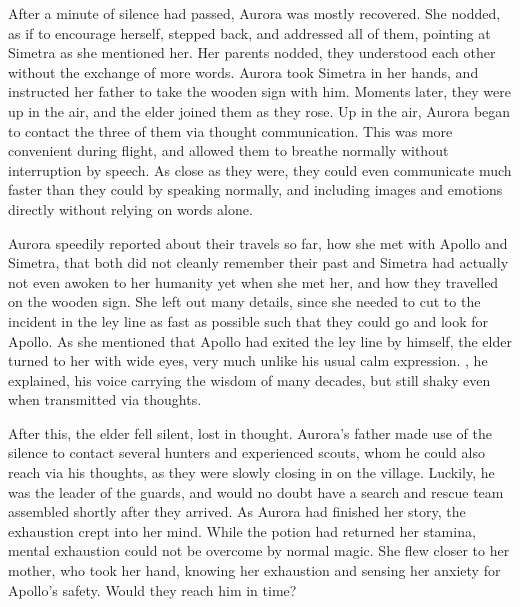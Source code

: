 After a minute of silence had passed, Aurora was mostly recovered. She nodded, as if to encourage herself, stepped back, and addressed all of them, pointing at Simetra as she mentioned her. 
Her parents nodded, they understood each other without the exchange of more words. Aurora took Simetra in her hands, and instructed her father to take the wooden sign with him. Moments later, they were up in the air, and the elder joined them as they rose. Up in the air, Aurora began to contact the three of them via thought communication. This was more convenient during flight, and allowed them to breathe normally without interruption by speech. As close as they were, they could even communicate much faster than they could by speaking normally, and including images and emotions directly without relying on words alone.

Aurora speedily reported about their travels so far, how she met with Apollo and Simetra, that both did not cleanly remember their past and Simetra had actually not even awoken to her humanity yet when she met her, and how they travelled on the wooden sign. She left out many details, since she needed to cut to the incident in the ley line as fast as possible such that they could go and look for Apollo. As she mentioned that Apollo had exited the ley line by himself, the elder turned to her with wide eyes, very much unlike his usual calm expression. , he explained, his voice carrying the wisdom of many decades, but still shaky even when transmitted via thoughts. 

After this, the elder fell silent, lost in thought. Aurora's father made use of the silence to contact several hunters and experienced scouts, whom he could also reach via his thoughts, as they were slowly closing in on the village. Luckily, he was the leader of the guards, and would no doubt have a search and rescue team assembled shortly after they arrived. As Aurora had finished her story, the exhaustion crept into her mind. While the potion had returned her stamina, mental exhaustion could not be overcome by normal magic. She flew closer to her mother, who took her hand, knowing her exhaustion and sensing her anxiety for Apollo's safety. Would they reach him in time?
